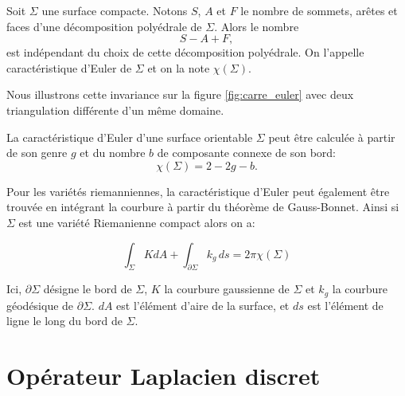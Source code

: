 \begin{definition}
Soit $\Sigma$ une surface compacte. Notons $S$, $A$ et $F$ le nombre de sommets, arêtes et faces d'une décomposition polyédrale de $\Sigma$. Alors le nombre
$$
S-A+F,
$$
est indépendant du choix de cette décomposition polyédrale. On l’appelle caractéristique d’Euler de $\Sigma$ et on la note $\chi(\Sigma)$.
\end{definition}

Nous illustrons cette invariance sur la figure \ref{fig:carre_euler} avec deux triangulation différente d'un même domaine.

La caractéristique d'Euler d'une surface orientable $\Sigma$ peut être calculée à partir de son genre $g$ et du nombre $b$ de composante connexe de son bord:
$$
\chi(\Sigma) = 2-2g-b.
$$

Pour les variétés riemanniennes, la caractéristique d'Euler peut également être trouvée en intégrant la courbure à partir du théorème de Gauss-Bonnet. Ainsi si $\Sigma$ est une variété Riemanienne compact alors on a:

$$
\displaystyle\int_\Sigma KdA+\int_{\partial\Sigma} k_{g}\,ds=2\pi \chi (\Sigma)
$$

Ici, $\partial\Sigma$ désigne le bord de $\Sigma$, $K$ la courbure gaussienne de $\Sigma$ et $k_g$ la courbure géodésique de $\partial\Sigma$. $dA$ est l'élément d'aire de la surface, et $ds$ est l'élément de ligne le long du bord de $\Sigma$.


\chapter{Opérateur Laplacien discret}
\label{Op_lap_discr}

